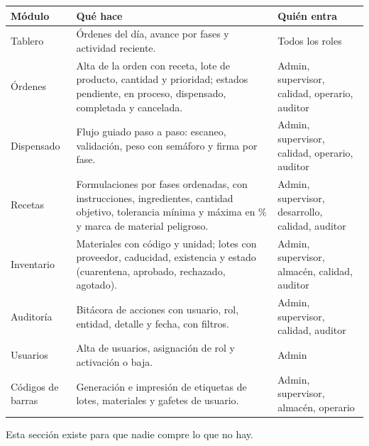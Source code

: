 \documentclass[11pt,letterpaper]{article}
\begin{document}
\noindent
\footnotesize
\begin{tabularx}{\linewidth}{@{}L{3.2cm} X L{3.6cm}@{}}
\toprule
\textbf{Módulo} & \textbf{Qué hace} & \textbf{Quién entra} \\
\midrule
Tablero & Órdenes del día, avance por fases y actividad reciente. & Todos los roles \\
Órdenes & Alta de la orden con receta, lote de producto, cantidad y prioridad; estados pendiente, en proceso, dispensado, completada y cancelada. & Admin, supervisor, calidad, operario, auditor \\
Dispensado & Flujo guiado paso a paso: escaneo, validación, peso con semáforo y firma por fase. & Admin, supervisor, calidad, operario, auditor \\
Recetas & Formulaciones por fases ordenadas, con instrucciones, ingredientes, cantidad objetivo, tolerancia mínima y máxima en \% y marca de material peligroso. & Admin, supervisor, desarrollo, calidad, auditor \\
Inventario & Materiales con código y unidad; lotes con proveedor, caducidad, existencia y estado (cuarentena, aprobado, rechazado, agotado). & Admin, supervisor, almacén, calidad, auditor \\
Auditoría & Bitácora de acciones con usuario, rol, entidad, detalle y fecha, con filtros. & Admin, supervisor, calidad, auditor \\
Usuarios & Alta de usuarios, asignación de rol y activación o baja. & Admin \\
Códigos de barras & Generación e impresión de etiquetas de lotes, materiales y gafetes de usuario. & Admin, supervisor, almacén, operario \\
\bottomrule
\end{tabularx}
\normalsize

\vspace{14pt}


\noindent Esta sección existe para que nadie compre lo que no hay.

\vspace{6pt}
\end{document}
